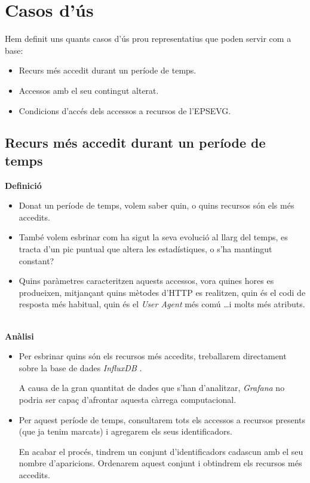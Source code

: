 \section{Casos d'ús}\label{sec:analysis-visualization-use-cases}

Hem definit uns quants casos d'ús prou representatius que poden servir com a base:

\begin{itemize}
    \item Recurs més accedit durant un període de temps.
    \item Accessos amb el seu contingut alterat.
    \item Condicions d'accés dels accessos a recursos de l'EPSEVG.
\end{itemize}

\subsection{Recurs més accedit durant un període de temps}\label{subsec:most-accessed-resource}

\textbf{Definició}

\begin{itemize}
    \item Donat un període de temps, volem saber quin, o quins recursos són els més accedits.
    \item També volem esbrinar com ha sigut la seva evolució al llarg del temps, es tracta d'un pic puntual que altera les estadístiques, o s'ha mantingut constant?
    \item Quins paràmetres caracteritzen aquests accessos, vora quines hores es produeixen, mitjançant quins mètodes d'\gls{HTTP} es realitzen, quin és el codi de resposta més habitual, quin és el \textit{User Agent} més comú \dots i molts més atributs.
\end{itemize}

\noindent \\
\textbf{Anàlisi}

\begin{itemize}
    \item Per esbrinar quins són els recursos més accedits, treballarem directament sobre la base de dades \textit{InfluxDB} .

    A causa de la gran quantitat de dades que s'han d'analitzar, \textit{Grafana} no podria ser capaç d'afrontar aquesta càrrega computacional.

    \item Per aquest període de temps, consultarem tots els accessos a recursos presents (que ja tenim marcats) i agregarem els seus identificadors.

    En acabar el procés, tindrem un conjunt d'identificadors cadascun amb el seu nombre d'aparicions.
    Ordenarem aquest conjunt i obtindrem els recursos més accedits.
\end{itemize}

